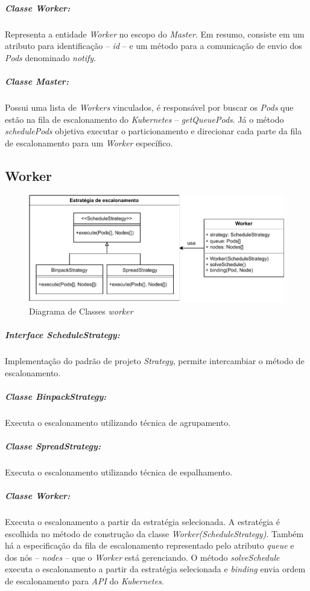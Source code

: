 \subparagraph{Classe \textit{Worker}:}
Representa a entidade \textit{Worker} no escopo do \textit{Master}. Em resumo, consiste em um atributo para identificação -- \textit{id} -- e um método para a comunicação de envio dos \textit{Pods} denominado \textit{notify}.

\subparagraph{Classe \textit{Master}:}
Possui uma lista de \textit{Workers} vinculados, é responsável por buscar os \textit{Pods} que estão na fila de escalonamento do \textit{Kubernetes} -- \textit{getQueuePods}. Já o método \textit{schedulePods} objetiva executar o particionamento e direcionar cada parte da fila de escalonamento para um \textit{Worker} específico.
\subsection{Worker}
\begin{figure}[h!]
	\caption{\label{fig:worker_class_diagram}Diagrama de Classes \textit{worker}}
	\centering
	\includegraphics[width=1\linewidth]{assets/worker-class-diagram.pdf}
\end{figure}

\subparagraph{Interface \textit{ScheduleStrategy}:}
Implementação do padrão de projeto \textit{Strategy}, permite intercambiar o método de escalonamento.

\subparagraph{Classe \textit{BinpackStrategy}:}
Executa o escalonamento utilizando técnica de agrupamento.

\subparagraph{Classe \textit{SpreadStrategy}:}
Executa o escalonamento utilizando técnica de espalhamento.

\subparagraph{Classe \textit{Worker}:}
Executa o escalonamento a partir da estratégia selecionada. A estratégia é escolhida no método de construção da classe \textit{Worker(ScheduleStrategy)}. Também há a especificação da fila de escalonamento representado pelo atributo \textit{queue} e dos nós -- \textit{nodes} -- que o \textit{Worker} está gerenciando. O método \textit{solveSchedule} executa o escalonamento a partir da estratégia selecionada e \textit{binding} envia ordem de escalonamento para \textit{API} do \textit{Kubernetes}.

